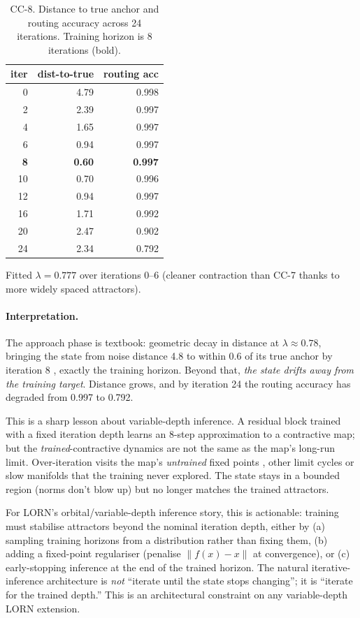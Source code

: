 \documentclass[10pt, twocolumn, a4paper]{article}
\begin{document}
\begin{table}[t]
\centering\small
\caption{CC-8. Distance to true anchor and routing accuracy across 24 iterations. Training horizon is 8 iterations (bold).}
\label{tab:cc8}
\begin{tabular}{rrr}
\toprule
iter & dist-to-true & routing acc \\
\midrule
0  & 4.79 & 0.998 \\
2  & 2.39 & 0.997 \\
4  & 1.65 & 0.997 \\
6  & 0.94 & 0.997 \\
\textbf{8}  & \textbf{0.60} & \textbf{0.997} \\
10 & 0.70 & 0.996 \\
12 & 0.94 & 0.997 \\
16 & 1.71 & 0.992 \\
20 & 2.47 & 0.902 \\
24 & 2.34 & 0.792 \\
\bottomrule
\end{tabular}
\end{table}

Fitted $\lambda = 0.777$ over iterations 0--6 (cleaner contraction than CC-7 thanks to more widely spaced attractors).

\paragraph{Interpretation.} The approach phase is textbook: geometric decay in distance at $\lambda \approx 0.78$, bringing the state from noise distance 4.8 to within 0.6 of its true anchor by iteration 8 ,  exactly the training horizon. Beyond that, \emph{the state drifts away from the training target}. Distance grows, and by iteration 24 the routing accuracy has degraded from 0.997 to 0.792.

This is a sharp lesson about variable-depth inference. A residual block trained with a fixed iteration depth learns an 8-step approximation to a contractive map; but the \emph{trained}-contractive dynamics are not the same as the map's long-run limit. Over-iteration visits the map's \emph{untrained} fixed points ,  other limit cycles or slow manifolds that the training never explored. The state stays in a bounded region (norms don't blow up) but no longer matches the trained attractors.

For LORN's orbital/variable-depth inference story, this is actionable: training must stabilise attractors beyond the nominal iteration depth, either by (a) sampling training horizons from a distribution rather than fixing them, (b) adding a fixed-point regulariser (penalise $\|f(x) - x\|$ at convergence), or (c) early-stopping inference at the end of the trained horizon. The natural iterative-inference architecture is \emph{not} ``iterate until the state stops changing''; it is ``iterate for the trained depth.'' This is an architectural constraint on any variable-depth LORN extension.
\end{document}

